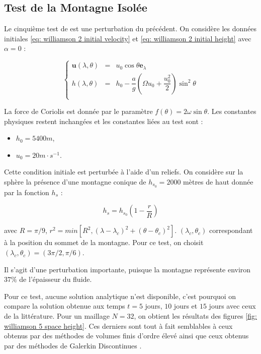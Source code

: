 \subsection{Test de la Montagne Isolée}

Le cinquième test de \cite{Williamson1992} est une perturbation du précédent.
On considère les données initiales \eqref{eq: williamson 2 initial velocity} et \eqref{eq: williamson 2 initial height} avec $\alpha = 0$ :

\begin{equation}
\left\lbrace
\begin{array}{rcl}
\mathbf{u}(\lambda, \theta) & = & u_0 \cos \theta \mathbf{e}_{\lambda} \\
h(\lambda, \theta) & = & h_0 - \dfrac{a}{g} \left( \Omega u_0 + \dfrac{u_0^2}{2} \right) \sin^2 \theta \\
\end{array}
\right.
\end{equation}

La force de Coriolis est donnée par le paramètre $f(\theta) = 2 \omega \sin \theta$. Les constantes physiques restent inchangées et les constantes liées au test sont :

\begin{itemize}
\item $h_0 = 5400 \si{m}$,
\item $u_0 = 20 m \cdot \si{s^{-1}}$.
\end{itemize}

Cette condition initiale est perturbée à l'aide d'un reliefs.
On considère sur la sphère la présence d'une montagne conique de $h_{s_0} = 2000$ mètres de haut donnée par la fonction $h_s$ :

\begin{equation}
h_s = h_{s_0} \left( 1 - \dfrac{r}{R} \right)
\end{equation}

avec $R= \pi / 9$, $r^2 = min \left[ R^2, \left( \lambda - \lambda_c \right)^2 + \left( \theta - \theta_c \right)^2 \right]$. $(\lambda_c, \theta_c)$ correspondant à la position du sommet de la montagne. Pour ce test, on choisit $(\lambda_c, \theta_c) = (3 \pi / 2, \pi / 6)$.

Il s'agit d'une perturbation importante, puisque la montagne représente environ $37 \%$ de l'épaisseur du fluide.

Pour ce test, aucune solution analytique n'est disponible, c'est pourquoi on compare la solution obtenue aux temps $t=5$ jours, $10$ jours et $15$ jours avec ceux de la littérature. Pour un maillage $N=32$, on obtient les résultats des figures \ref{fig: williamson 5 space height}. Ces derniers sont tout à fait semblables à ceux obtenus par des méthodes de volumes finis \cite{Katta2015, Chen2008} d'ordre élevé ainsi que ceux obtenus par des méthodes de Galerkin Discontinues \cite{Nair2005}. 

